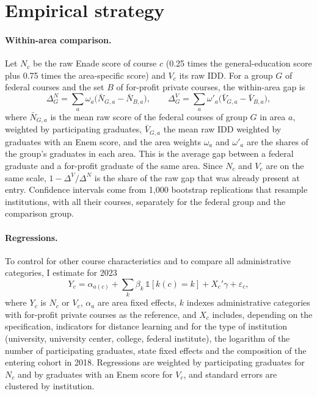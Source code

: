 \documentclass[12pt,letterpaper]{article}
\begin{document}
\section{Empirical strategy}\label{sec:method}

\paragraph{Within-area comparison.} Let $N_c$ be the raw Enade score of course $c$ (0.25 times the general-education score plus 0.75 times the area-specific score) and $V_c$ its raw IDD. For a group $G$ of federal courses and the set $B$ of for-profit private courses, the within-area gap is
\begin{equation}\label{eq:matched}
\Delta^N_G=\sum_{a} \omega_{a}\Big(\bar N_{G,a}-\bar N_{B,a}\Big), \qquad
\Delta^V_G=\sum_{a} \omega'_{a}\Big(\bar V_{G,a}-\bar V_{B,a}\Big),
\end{equation}
where $\bar N_{G,a}$ is the mean raw score of the federal courses of group $G$ in area $a$, weighted by participating graduates, $\bar V_{G,a}$ the mean raw IDD weighted by graduates with an Enem score, and the area weights $\omega_a$ and $\omega'_a$ are the shares of the group's graduates in each area. This is the average gap between a federal graduate and a for-profit graduate of the same area. Since $N_c$ and $V_c$ are on the same scale, $1-\Delta^V/\Delta^N$ is the share of the raw gap that was already present at entry. Confidence intervals come from 1,000 bootstrap replications that resample institutions, with all their courses, separately for the federal group and the comparison group.

\paragraph{Regressions.} To control for other course characteristics and to compare all administrative categories, I estimate for 2023
\begin{equation}\label{eq:reg}
Y_c=\alpha_{a(c)}+\sum_{k}\beta_k\,\mathbb{1}[k(c)=k]+X_c'\gamma+\varepsilon_c,
\end{equation}
where $Y_c$ is $N_c$ or $V_c$, $\alpha_a$ are area fixed effects, $k$ indexes administrative categories with for-profit private courses as the reference, and $X_c$ includes, depending on the specification, indicators for distance learning and for the type of institution (university, university center, college, federal institute), the logarithm of the number of participating graduates, state fixed effects and the composition of the entering cohort in 2018. Regressions are weighted by participating graduates for $N_c$ and by graduates with an Enem score for $V_c$, and standard errors are clustered by institution.
\end{document}

